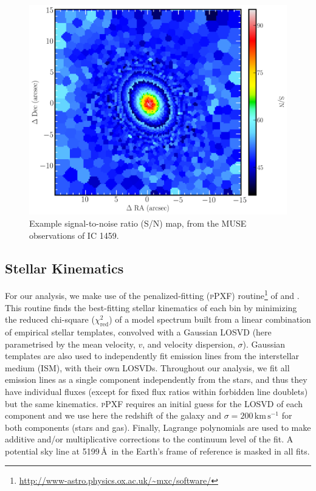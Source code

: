 		\begin{figure}
			\centering
			\includegraphics[width=.6\textwidth]{chapter2/egSNR.png}
			\caption[Example signal-to-noise map]{Example signal-to-noise ratio (S/N) map, from the MUSE observations of IC 1459.}
			\label{fig:egSNR}
		\end{figure}

	\subsection{Stellar Kinematics}
		\label{subsec:StellarFit}
		For our analysis, we make use of the penalized-fitting (\textsc{pPXF}) routine\footnote{\url{http://www-astro.physics.ox.ac.uk/~mxc/software/}} of \citet{Cappellari2004} and \citet{Cappellari2016a}. This routine finds the best-fitting stellar kinematics of each bin by minimizing the reduced chi-square ($\chi^2_\text{red}$) of a model spectrum built from a linear combination of empirical stellar templates, convolved with a Gaussian LOSVD (here parametrised by the mean velocity, $v$, and velocity dispersion, $\sigma$). Gaussian templates are also used to independently fit emission lines from the interstellar medium (ISM), with their own LOSVDs. Throughout our analysis, we fit all emission lines as a single component independently from the stars, and thus they have individual fluxes (except for fixed flux ratios within forbidden line doublets) but the same kinematics. \textsc{pPXF} requires an initial guess for the LOSVD of each component and we use here the redshift of the galaxy and $\sigma = 200\,\mathrm{km\,s^{-1}}$ for both components (stars and gas). Finally, Lagrange polynomials are used to make additive and/or multiplicative corrections to the continuum level of the fit. A potential sky line at 5199\,\AA\ in the Earth's frame of reference is masked in all fits.

